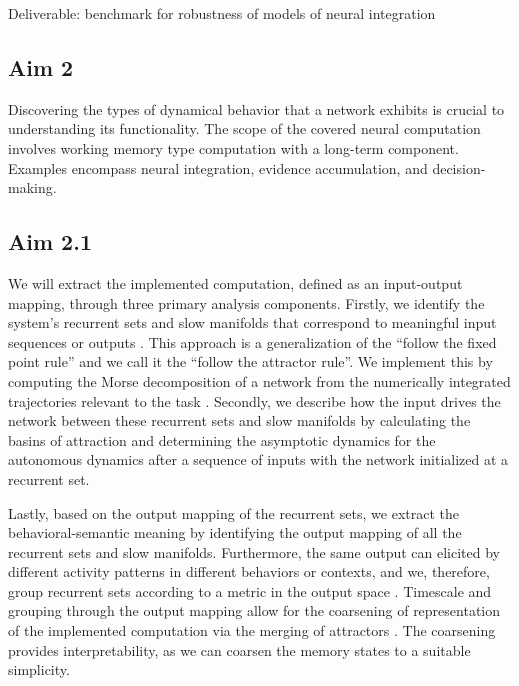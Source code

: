\documentclass[12pt,letterpaper, onecolumn]{article}
\theoremstyle{definition}
\theoremstyle{remark}
\begin{document}
Deliverable: benchmark for robustness of models of neural integration





\newpage

\subsection*{Aim 2}
Discovering the types of dynamical behavior that a network exhibits is crucial to understanding its functionality. The scope of the covered neural computation involves working memory type computation with a long-term component. Examples encompass neural integration, evidence accumulation, and decision-making.

\subsection*{Aim 2.1}
We will extract the implemented computation, defined as an input-output mapping, through three primary analysis components.
Firstly, we identify the system's recurrent sets and slow manifolds that correspond to meaningful input sequences or outputs \citep{goudar2018}. This approach is a generalization of the ``follow the fixed point rule'' and we call it the ``follow the attractor rule''. We implement this by computing the Morse decomposition of a network from the numerically integrated trajectories relevant to the task \citep{mischaikow1999, arai2009database}.
Secondly, we describe how the input drives the network between these recurrent sets and slow manifolds by calculating the basins of attraction and determining the asymptotic dynamics for the autonomous dynamics after a sequence of inputs with the network initialized at a recurrent set. 


Lastly, based on the output mapping of the recurrent sets, we extract the behavioral-semantic meaning by identifying the output mapping of all the recurrent sets and slow manifolds. Furthermore, the same output can elicited by different activity patterns in different behaviors or contexts, and we, therefore, group recurrent sets according to a metric in the output space \citep{athalye2023, myers2022}.
Timescale and grouping through the output mapping allow for the coarsening of representation of the implemented computation via the merging of attractors \citep{braun2010}.
The coarsening provides interpretability, as we can coarsen the memory states to a suitable simplicity.
\end{document}
